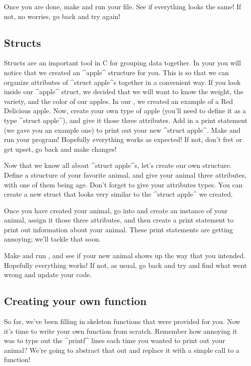 \documentclass{tufte-handout}
\begin{document}
Once you are done, make and run your file.  See if everything looks the same!  If not, no worries, go back and try again!


\subsection{Structs}


Structs are an important tool in C for grouping data together.  In your
 you will notice that we created an ^apple^ structure
for you.  This is so that we can
organize attributes of ^struct apple^s together in a convenient way.  If
you look inside our ^apple^ struct, we decided that we will want to know
the weight, the variety, and the color of our apples.  In our
, we created an example of a Red Delicious apple.
Now, create your own type of apple (you'll need to define it as a type
^struct apple^), and give it those three attributes.  Add in a print
statement (we gave you an example one) to print out your new ^struct
apple^.  Make and run your  program!  Hopefully everything
works as expected!  If not, don't fret or get upset, go back and make
changes!

Now that we know all about ^struct apple^s, let's create our own
structure. Define a structure of your favorite animal, and give your
animal three attributes, with one of them being age. Don't forget to
give your attributes types. You can create a new struct that looks very
similar to the ^struct apple^ we created.

Once you have created your animal, go into  and
create an instance of your animal, assign it those three attributes, and
then create a print statement to print out information about your
animal.  These print statements are getting annoying; we'll tackle that
soon.

Make and run , and see if your new animal shows up the way that
you intended.  Hopefully everything works!  If not, as usual, go back
and try and find what went wrong and update your code. 


\subsection{Creating your own function}

So far, we've been filling in skeleton functions that were provided for
you. Now it's time to write your own function from scratch.  Remember
how annoying it was to type out the ^printf^ lines each
time you wanted to print out your animal?  We're going to abstract that
out and replace it with a simple call to a function! 
\end{document}
